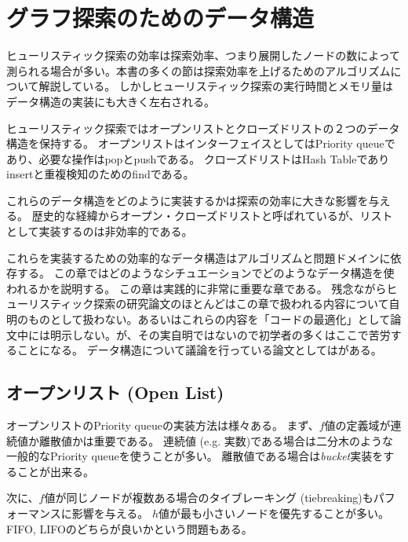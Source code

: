 \chapter{グラフ探索のためのデータ構造}
\label{ch:search-performance}

ヒューリスティック探索の効率は探索効率、つまり展開したノードの数によって測られる場合が多い。本書の多くの節は探索効率を上げるためのアルゴリズムについて解説している。
しかしヒューリスティック探索の実行時間とメモリ量はデータ構造の実装にも大きく左右される。

ヒューリスティック探索ではオープンリストとクローズドリストの２つのデータ構造を保持する。
オープンリストはインターフェイスとしてはPriority queueであり、必要な操作はpopとpushである。
クローズドリストはHash Tableでありinsertと重複検知のためのfindである。

これらのデータ構造をどのように実装するかは探索の効率に大きな影響を与える。
歴史的な経緯からオープン・クローズドリストと呼ばれているが、リストとして実装するのは非効率的である。

これらを実装するための効率的なデータ構造はアルゴリズムと問題ドメインに依存する。
この章ではどのようなシチュエーションでどのようなデータ構造を使われるかを説明する。
この章は実践的に非常に重要な章である。
残念ながらヒューリスティック探索の研究論文のほとんどはこの章で扱われる内容について自明のものとして扱わない。あるいはこれらの内容を「コードの最適化」として論文中には明示しない。が、その実自明ではないので初学者の多くはここで苦労することになる。
データ構造について議論を行っている論文としては\cite{burns2012implementing}がある。




\section{オープンリスト (Open List)}
\label{sec:open-list}
オープンリストのPriority queueの実装方法は様々ある。
まず、$f$値の定義域が連続値か離散値かは重要である。
連続値 (e.g. 実数)である場合は二分木のような一般的なPriority queueを使うことが多い。
離散値である場合は{\it bucket}実装をすることが出来る。

次に、$f$値が同じノードが複数ある場合のタイブレーキング (tiebreaking)もパフォーマンスに影響を与える。
$h$値が最も小さいノードを優先することが多い。
FIFO, LIFOのどちらが良いかという問題もある。

